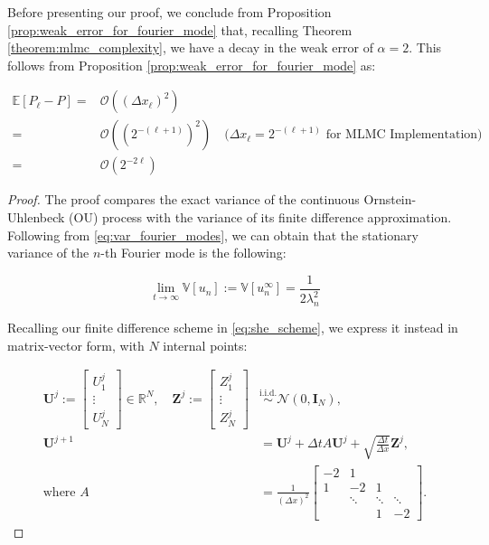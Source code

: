 Before presenting our proof, we conclude from Proposition 
\ref{prop:weak_error_for_fourier_mode}
that, recalling Theorem \ref{theorem:mlmc_complexity}, 
we have a decay in the weak error of $\alpha = 2$. This follows from Proposition 
\ref{prop:weak_error_for_fourier_mode} as:

\begin{align*}
    \mathbb{E}[P_\ell - P] =& \mathcal{O}\left((\Delta x_\ell)^2\right)\\
                           =& \mathcal{O}\left((2^{-(\ell + 1)})^2\right) 
                           \quad (\Delta x_\ell = 2^{-(\ell+1)} \text{ for MLMC Implementation)}\\
                           =& \mathcal{O}\left( 2^{-2\ell}\right)
\end{align*}


\begin{proof}
The proof compares the exact variance of the
continuous Ornstein-Uhlenbeck 
(OU) process
with the variance of its finite difference approximation. 
Following from \eqref{eq:var_fourier_modes}, we can obtain that the 
stationary variance of the $n$-th Fourier mode is the following:

\begin{equation}\label{eq:stationary_variance}
    \lim_{t \to \infty} \mathbb{V}[u_n]
    := \mathbb{V}[u_n^{\infty}] = \frac{1}{2\lambda_n^2}
\end{equation}

Recalling our finite difference scheme in \eqref{eq:she_scheme},
we express it instead in matrix-vector form, with $N$ 
internal points:

\begin{align}
    \mathbf{U}^j := 
    \begin{bmatrix}
        U_1^j \\
        \vdots \\
        U_N^j
    \end{bmatrix} 
    \in \mathbb{R}^N,
    \quad
    \mathbf{Z}^j := 
    \begin{bmatrix}
        Z_1^j \\
        \vdots \\
        Z_N^j
    \end{bmatrix}
    &\overset{\mathrm{i.i.d.}}{\sim} \mathcal{N}(0, \mathbf{I}_N), \\
    \mathbf{U}^{j+1} &= \mathbf{U}^j + \Delta t A \mathbf{U}^j
    + \sqrt{\frac{\Delta t}{\Delta x}} \mathbf{Z}^j, \label{eq:scheme_matrix_vector}\\
    \text{where } A &= \frac{1}{(\Delta x)^2}
    \begin{bmatrix}
        -2 & 1 & & \\
        1 & -2 & 1  \\
        & \ddots & \ddots & \ddots \\
        & & 1 & -2
    \end{bmatrix}.
\end{align}


\end{proof}
